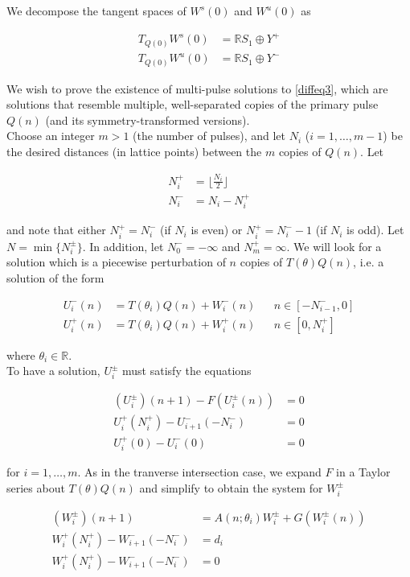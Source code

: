 \documentclass[12pt]{article}
\def\R{{\mathbb R}}
\begin{document}
We decompose the tangent spaces of $W^s(0)$ and $W^u(0)$ as

\begin{align*}
T_{Q(0)} W^s(0) &= \R S_1 \oplus Y^+ \\
T_{Q(0)} W^u(0) &= \R S_1 \oplus Y^-
\end{align*}

We wish to prove the existence of multi-pulse solutions to \eqref{diffeq3}, which are solutions that resemble multiple, well-separated copies of the primary pulse $Q(n)$ (and its symmetry-transformed versions).\\

Choose an integer $m > 1$ (the number of pulses), and let $N_i$ ($i = 1, \dots, m-1$) be the desired distances (in lattice points) between the $m$ copies of $Q(n)$. Let 

\begin{align*}
N_i^+ &= \lfloor \frac{N_i}{2} \rfloor \\
N_i^- &= N_i - N_i^+
\end{align*}

and note that either $N_i^+ = N_i^-$ (if $N_i$ is even) or $N_i^+ = N_i^- - 1$ (if $N_i$ is odd). Let $N = \min\{ N_i^\pm \}$. In addition, let $N_0^- = -\infty$ and $N_m^+ = \infty$. We will look for a solution which is a piecewise perturbation of $n$ copies of $T(\theta) Q(n)$, i.e. a solution of the form

\begin{align*}
U_i^-(n) &= T(\theta_i) Q(n) + W_i^-(n) && n \in [-N_{i-1}^-, 0] \\
U_i^+(n) &= T(\theta_i) Q(n) + W_i^+(n) && n \in [0, N_i^+]
\end{align*}

where $\theta_i \in \R$.\\

To have a solution, $U_i^\pm$ must satisfy the equations

\begin{align}
(U_i^\pm)(n+1) - F(U_i^\pm(n)) &= 0 \\
U_i^+(N_i^+) - U_{i+1}^-(-N_i^-) &= 0 \\
U_i^+(0) - U_i^-(0) &= 0
\end{align}

for $i = 1, \dots, m$. As in the tranverse intersection case, we expand $F$ in a Taylor series about $T(\theta) Q(n)$ and simplify to obtain the system for $W_i^\pm$

\begin{align}
(W_i^\pm)(n+1) &= A(n; \theta_i) W_i^\pm + G(W_i^\pm(n)) \\
W_i^+(N_i^+) - W_{i+1}^-(-N_i^-) &= d_i \\
W_i^+(N_i^+) - W_{i+1}^-(-N_i^-) &= 0 \\
\end{align}
\end{document}
